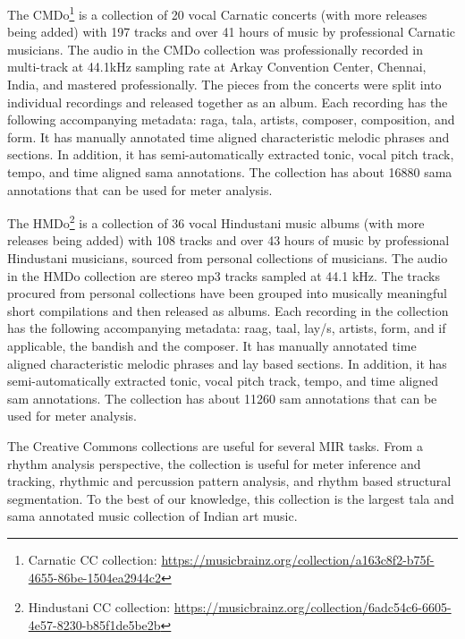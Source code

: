 The \acrfull{CMDo}\footnote{Carnatic CC collection: \url{https://musicbrainz.org/collection/a163c8f2-b75f-4655-86be-1504ea2944c2}} is a collection of 20 vocal Carnatic concerts (with more releases being added) with 197 tracks and over 41 hours of music by professional Carnatic musicians. The audio in the \acrshort{CMDo} collection was professionally recorded in multi-track at 44.1kHz sampling rate at Arkay Convention Center, Chennai, India, and mastered professionally. The pieces from the concerts were split into individual recordings and released together as an album. Each recording has the following accompanying metadata: \gls{raga}, \gls{tala}, artists, composer, composition, and form. It has manually annotated time aligned characteristic melodic phrases and sections. In addition, it has semi-automatically extracted tonic, vocal pitch track, tempo, and time aligned \gls{sama} annotations. The collection has about 16880 \gls{sama} annotations that can be used for meter analysis.

The \acrfull{HMDo}\footnote{Hindustani CC collection: \url{https://musicbrainz.org/collection/6adc54c6-6605-4e57-8230-b85f1de5be2b}} is a collection of 36 vocal Hindustani music albums (with more releases being added) with 108 tracks and over 43 hours of music by professional Hindustani musicians, sourced from personal collections of musicians. The audio in the \acrshort{HMDo} collection are stereo mp3 tracks sampled at 44.1 kHz. The tracks procured from personal collections have been grouped into musically meaningful short compilations and then released as albums. Each recording in the collection has the following accompanying metadata: \gls{raag}, \gls{taal}, \gls{lay}/s, artists, form, and if applicable, the \gls{bandish} and the composer. It has manually annotated time aligned characteristic melodic phrases and \gls{lay} based sections. In addition, it has semi-automatically extracted tonic, vocal pitch track, tempo, and time aligned \gls{sam} annotations. The collection has about 11260 \gls{sam} annotations that can be used for meter analysis. 

The Creative Commons collections are useful for several \gls{MIR} tasks. From a rhythm analysis perspective, the collection is useful for meter inference and tracking, rhythmic and percussion pattern analysis, and rhythm based structural segmentation. To the best of our knowledge, this collection is the largest \gls{tala} and \gls{sama} annotated music collection of Indian art music. 
